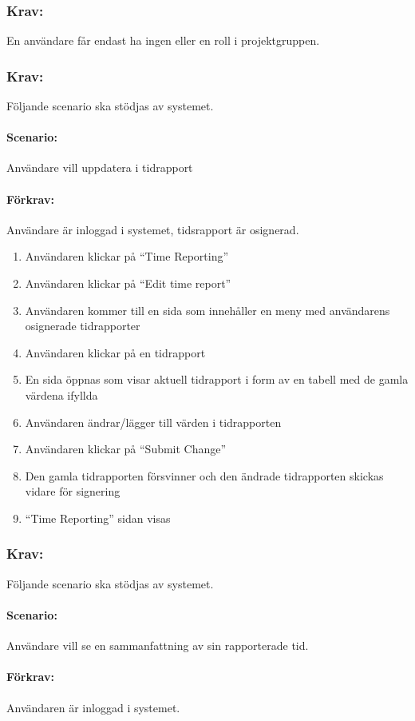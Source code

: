 \documentclass[paper=a4, fontsize=11pt,twoside]{article}
\begin{document}
	\subsubsection{Krav:}En användare får endast ha ingen eller en roll i projektgruppen.
	\subsubsection{Krav:} Följande scenario ska stödjas av systemet.
	\paragraph{Scenario:}Användare vill uppdatera i tidrapport
	\paragraph{Förkrav:}
	Användare är inloggad i systemet, tidsrapport är osignerad.
	\begin{enumerate}
		\item Användaren klickar på “Time Reporting”
		\item	Användaren klickar på “Edit time report”
		\item	Användaren kommer till en sida som innehåller en meny med användarens osignerade tidrapporter
		\item 	Användaren klickar på en tidrapport
		\item	En sida öppnas som visar aktuell tidrapport i form av en tabell med de gamla värdena ifyllda
		\item	Användaren ändrar/lägger till värden i tidrapporten
		\item	Användaren klickar på “Submit Change”
		\item	Den gamla tidrapporten försvinner och den ändrade tidrapporten skickas vidare för signering
		\item	“Time Reporting” sidan visas
		
	\end{enumerate}
	\subsubsection{Krav:}Följande scenario ska stödjas av systemet.
	\paragraph{Scenario:}Användare vill se en sammanfattning av sin rapporterade tid.
	\paragraph{Förkrav:}
	Användaren är inloggad i systemet.
\end{document}
